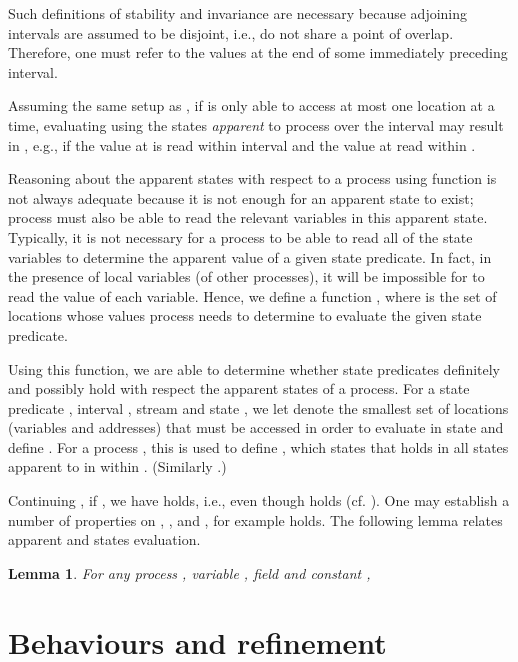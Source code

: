 \documentclass{article}
\theoremstyle{plain}
\newcounter{thm}
\newtheorem{lemma}[thm]{Lemma}
\theoremstyle{definition}
\begin{document}
\noindent
Such definitions of stability and invariance are necessary because
adjoining intervals are assumed to be disjoint, i.e., do not share a
point of overlap. Therefore, one must refer to the values at the end
of some immediately preceding interval. \smallskip

Assuming the same setup as , if  is only able to
access at most one location at a time, evaluating  using the states \emph{apparent} to process  over the
interval  may result in , e.g., if the value at  is read within interval  and the value at  read within . 

Reasoning about the apparent states with respect to a process 
using function  is not always adequate because it is not
enough for an apparent state to exist; process  must also be able
to read the relevant variables in this apparent state. Typically, it
is not necessary for a process to be able to read all of the state
variables to determine the apparent value of a given state
predicate. In fact, in the presence of local variables (of other
processes), it will be impossible for  to read the value of each
variable. Hence, we define a
function , where  is the set of
locations whose values process  needs to determine to evaluate the
given state predicate.

\noindent
Using this function, we are able to determine whether state predicates
definitely and possibly hold with respect the apparent states of a
process. For a state predicate , interval , stream  and
state , we let  denote the smallest set of
locations (variables and addresses) that must be accessed in order to
evaluate  in state  and define . For a process , this is
used to define , which states that  holds in
all states apparent to  in  within . (Similarly
.)

\noindent 
Continuing , if , we have  holds, i.e.,  even though  holds
(cf. \cite{DDH12,HBDJ13}).
One may establish a number of properties on , ,
 and  \cite{HBDJ13}, for example
 holds.
The following lemma relates apparent and states evaluation.
\begin{lemma}
  \label{lem:stable}
  For any process , variable , field  and constant ,

  
\end{lemma}








\section{Behaviours and refinement}
\label{sec:behaviour-refinement-1}
\end{document}
